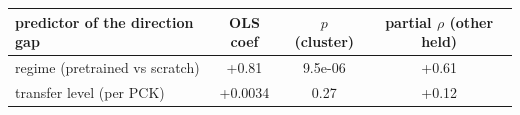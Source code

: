 \begin{tabular}{lccc}
\toprule
predictor of the direction gap & OLS coef & $p$ (cluster) & partial $\rho$ (other held) \\
\midrule
regime (pretrained vs scratch) & +0.81 & 9.5e-06 & +0.61 \\
transfer level (per PCK) & +0.0034 & 0.27 & +0.12 \\
\bottomrule
\end{tabular}
